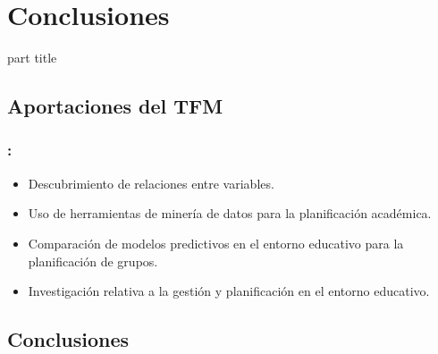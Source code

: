 \documentclass{beamer}
\begin{document}
\section{Conclusiones}
\begin{frame}
\begin{center}
	\begin{beamercolorbox}[
		sep=8pt,center,rounded=true,shadow=true]{part title}
		\secname
	\end{beamercolorbox}
\end{center}
\end{frame}

\subsection{Aportaciones del TFM}

\begin{frame}
\frametitle{\secname : \subsecname}
 \begin{itemize}
 	\item Descubrimiento de relaciones entre variables.
 	\item Uso de herramientas de minería de datos para la planificación académica.
 	\item Comparación de modelos predictivos en el entorno educativo para la planificación de grupos.
 	\item Investigación relativa a la gestión y planificación en el entorno educativo.
 \end{itemize}

\end{frame}

\subsection{Conclusiones}
\end{document}
